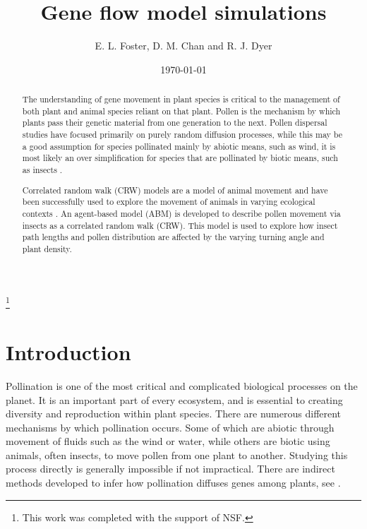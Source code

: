 \documentclass{tran-l}
\theoremstyle{definition}
\theoremstyle{remark}
\numberwithin{equation}{subsection}
\begin{document}
\title{Gene flow model simulations}


\author{ E. L. Foster, D. M. Chan and R. J. Dyer }

\address{Department of Mathematics and Applied Mathematics,
1015 Floyd Ave., Richmond, VA 23284}


\thanks{This work was completed with the support of NSF.}



\date{\today}




\begin{abstract}
The understanding of gene movement in plant species is critical to the
management of both plant and animal species reliant on that plant.
Pollen is the mechanism by which plants pass their genetic material from one
generation to the next. Pollen dispersal studies have focused
primarily on purely random diffusion processes, while this may be a good
assumption for species pollinated mainly by abiotic means, such as
wind, it is most likely an over simplification for species that are pollinated
by biotic means, such as insects \cite{Chan}.

Correlated random walk (CRW) models are a model of animal movement
\cite{Prasad05} and have been successfully used to explore the movement of
animals in varying ecological contexts \cite{Bartumeus07}. An agent-based model
(ABM) is developed to describe pollen movement via insects as
a correlated random walk (CRW). This model is used to explore how insect path
lengths and pollen distribution are affected by the varying
turning angle and plant density.

\end{abstract}

\maketitle

\section{{\bf Introduction}}
Pollination is one of the most critical and complicated biological processes on the planet.  It is an important part of every ecosystem, and is essential to creating diversity and reproduction within plant species.  There are numerous different mechanisms by which pollination occurs.  Some of which are abiotic through movement of fluids such as the wind or water, while others are biotic using animals, often insects, to move pollen from one plant to another.  Studying this process directly is generally impossible if not impractical.  There are indirect methods developed to infer how pollination diffuses genes among plants, see .  
\end{document}
